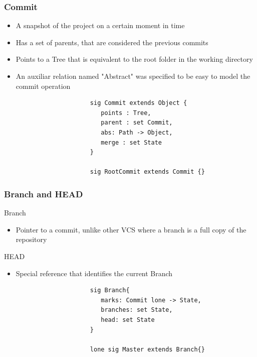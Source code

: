 \documentclass{beamer}
\begin{document}
\begin{frame}[fragile]
   \frametitle{Commit}
   \begin{itemize}
      	\item A snapshot of the project on a certain moment
      in time
      	\item Has a set of parents, that are considered the previous commits 
	\item Points to a Tree that is equivalent to the root folder in the
	working directory
	\item An auxiliar relation named "Abstract" was specified to be easy to
	model the commit operation
   \end{itemize}
   \tiny
   \color{blue}
   \begin{lstlisting}
                        sig Commit extends Object {
                           points : Tree,
                           parent : set Commit,
                           abs: Path -> Object,
                           merge : set State
                        }
                           
                        sig RootCommit extends Commit {}
\end{lstlisting}
\end{frame}

\begin{frame}[fragile]
\frametitle{Branch and HEAD}
   \begin{block}{Branch}
      \begin{itemize}
         \item Pointer to a commit, unlike other VCS where a branch is a full
	 copy of the repository
      \end{itemize}
   \end{block}
   \begin{block}{HEAD}
      \begin{itemize} 
         \item Special reference that identifies the current Branch
      \end{itemize}
   \end{block}
   \tiny
   \color{blue}
   \begin{lstlisting}
                        sig Branch{
                           marks: Commit lone -> State,
                           branches: set State,
                           head: set State
                        }

                        lone sig Master extends Branch{}
   \end{lstlisting}
\end{frame}
\end{document}
